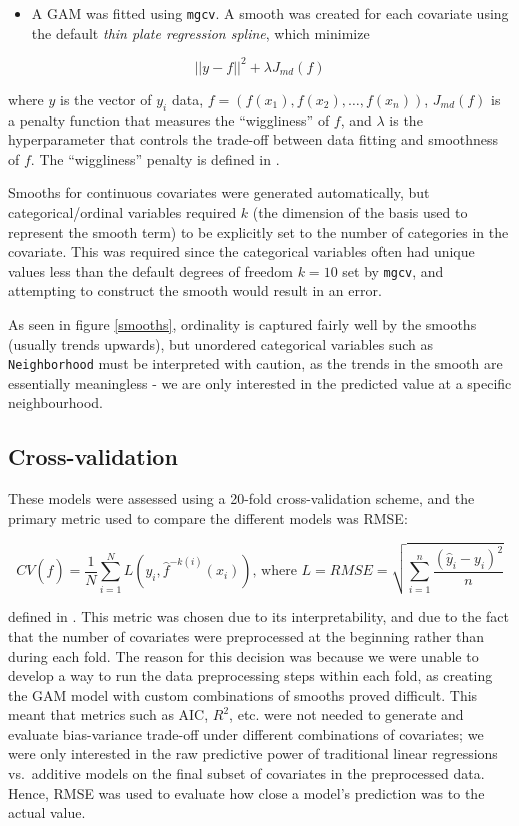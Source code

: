 \documentclass[aoas]{imsart}
\providecommand{\tightlist}{%
  \setlength{\itemsep}{0pt}\setlength{\parskip}{0pt}}
\numberwithin{equation}{section}
\theoremstyle{plain}
\theoremstyle{remark}
\begin{document}
\begin{itemize}
\tightlist
\item
  A GAM was fitted using \texttt{mgcv}. A smooth was created for each
  covariate using the default \emph{thin plate regression spline}, which
  minimize
\end{itemize}

\[
||y-f||^2 + \lambda J_{md}(f)
\]

where \(y\) is the vector of \(y_i\) data,
\(f = (f(x_1), f(x_2), \dots, f(x_n))\), \(J_{md}(f)\) is a penalty
function that measures the ``wiggliness'' of \(f\), and \(\lambda\) is
the hyperparameter that controls the trade-off between data fitting and
smoothness of \(f\). The ``wiggliness'' penalty is defined in
\citet{thinplateregressionsplines}.

Smooths for continuous covariates were generated automatically, but
categorical/ordinal variables required \(k\) (the dimension of the basis
used to represent the smooth term) to be explicitly set to the number of
categories in the covariate. This was required since the categorical
variables often had unique values less than the default degrees of
freedom \(k=10\) set by \texttt{mgcv}, and attempting to construct the
smooth would result in an error.

As seen in figure \ref{smooths}, ordinality is captured fairly well by
the smooths (usually trends upwards), but unordered categorical
variables such as \texttt{Neighborhood} must be interpreted with
caution, as the trends in the smooth are essentially meaningless - we
are only interested in the predicted value at a specific neighbourhood.

\hypertarget{cross-validation}{%
\subsection{Cross-validation}\label{cross-validation}}

These models were assessed using a 20-fold cross-validation scheme, and
the primary metric used to compare the different models was RMSE:

\[
CV(\hat f) = \frac{1}{N} \sum_{i=1}^N L\left(y_i, \hat f^{-k(i)}(x_i) \right) \text{, where } L=RMSE = \sqrt{\sum_{i=1}^n \frac{(\hat y_i - y_i)^2}{n}}
\]

defined in \citet{hastie01statisticallearning}. This metric was chosen
due to its interpretability, and due to the fact that the number of
covariates were preprocessed at the beginning rather than during each
fold. The reason for this decision was because we were unable to develop
a way to run the data preprocessing steps within each fold, as creating
the GAM model with custom combinations of smooths proved difficult. This
meant that metrics such as AIC, \(R^2\), etc. were not needed to
generate and evaluate bias-variance trade-off under different
combinations of covariates; we were only interested in the raw
predictive power of traditional linear regressions vs.~additive models
on the final subset of covariates in the preprocessed data. Hence, RMSE
was used to evaluate how close a model's prediction was to the actual
value.
\end{document}
